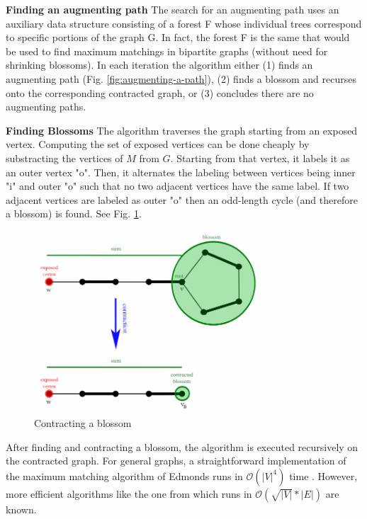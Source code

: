 \textbf{Finding an augmenting path} The search for an augmenting path uses an auxiliary data structure consisting of a forest F whose individual trees correspond to specific portions of the graph G. In fact, the forest F is the same that would be used to find maximum matchings in bipartite graphs (without need for shrinking blossoms). In each iteration the algorithm either (1) finds an augmenting path (Fig. \ref{fig:augmenting-a-path}), (2) finds a blossom and recurses onto the corresponding contracted graph, or (3) concludes there are no augmenting paths.

\textbf{Finding Blossoms}
The algorithm traverses the graph starting from an exposed vertex. Computing the set of exposed vertices can be done cheaply by substracting the vertices of $M$ from $G$. Starting from that vertex, it labels it as an outer vertex "o". Then, it alternates the labeling between vertices being inner "i" and outer "o" such that no two adjacent vertices have the same label. If two adjacent vertices are labeled as outer "o" then an odd-length cycle (and therefore a blossom) is found. See Fig. \ref{fig:contracting-a-blossom}.

\begin{figure}
	\centering
	\includegraphics[width=0.75\textwidth]{img/Edmonds_blossom_contraction}
	\caption{Contracting a blossom}
	\label{fig:contracting-a-blossom}
\end{figure}

After finding and contracting a blossom, the algorithm is executed recursively on the contracted graph. For general graphs, a straightforward implementation of the maximum matching algorithm of Edmonds runs in $\mathcal{O}(|V|^4)$ time \cite{papadimitriou1982combinatorial}. However, more efficient algorithms like the one from \citet{micali1980v} which runs in
$\mathcal{O}(\sqrt{|V|}*|E|)$ are known.

